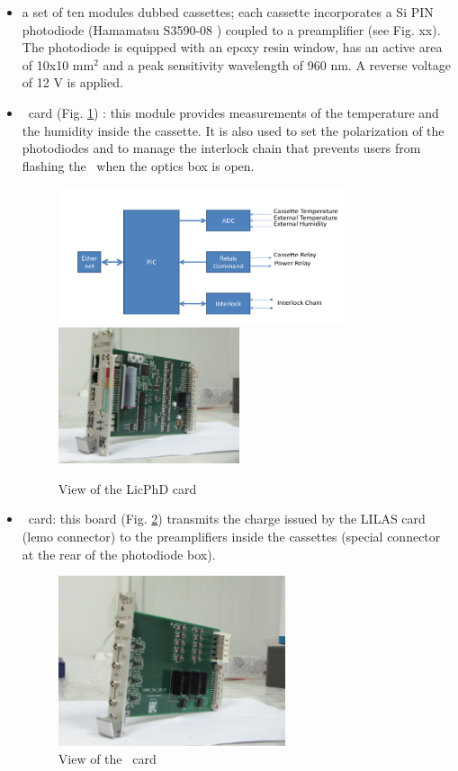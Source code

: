 \begin{itemize}
\item a set of ten modules dubbed cassettes; each cassette incorporates a Si PIN photodiode (Hamamatsu S3590-08 \cite{ref:photodiode}) coupled to a preamplifier (see Fig. xx). The photodiode is equipped with an epoxy resin window, has an active area of 10x10 mm$^{2}$ and a peak sensitivity wavelength of 960 nm. A reverse voltage of 12 V is applied.
\item \licphd~card (Fig. \ref{fig:laslicphd}) : this module provides measurements of  the temperature and the humidity inside the cassette. It is also used to set the polarization of the photodiodes and to
manage the interlock chain that prevents users from flashing the \laser~when the optics box is open.

\begin{figure}[htbp]
\centering
\includegraphics[height=4cm]{figures/licphd_scheme.pdf}
\includegraphics[height=4cm]{figures/licphd.JPG}
\caption{View of the LicPhD card}\label{fig:laslicphd}
\end{figure}

\item \charinjsplit~card: this board (Fig. \ref{fig:lascis}) transmits the charge issued by the LILAS card (lemo connector) to the preamplifiers inside the cassettes (special connector at the rear of the photodiode box). 
\begin{figure}[htbp]
\centering
\includegraphics[height=5cm]{figures/cis.JPG}
\caption{View of the  \charinjsplit~card}\label{fig:lascis}
\end{figure}


\end{itemize}
